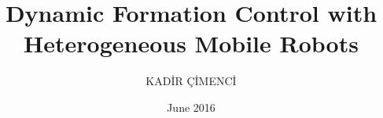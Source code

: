 \documentclass[chaparabic,ee,ms,12pt,oneandhalf]{metu}
\author{KADİR ÇİMENCİ}
\title{Dynamic Formation Control with Heterogeneous Mobile Robots}
\date{June 2016}
\begin{document}
\begin{preliminaries}

%
\end{preliminaries}
%   
% 
%







  





%


 
%
%
\end{document}
